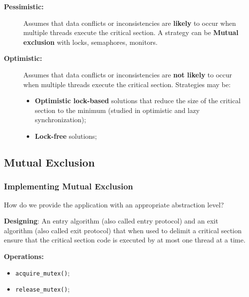 \begin{description}
    \item[\textbf{Pessimistic:}]
    Assumes that data conflicts or inconsistencies are \textbf{likely} to occur when multiple threads execute the critical section. A strategy can be \textbf{Mutual exclusion} with locks, semaphores, monitors.
    \item[\textbf{Optimistic:}]
    Assumes that data conflicts or inconsistencies are \textbf{not likely} to occur when multiple threads execute the critical section. Strategies may be:
    \begin{itemize}
        \item \textbf{Optimistic lock-based} solutions that reduce the size of the critical section to the minimum (studied in optimistic and lazy synchronization);
        \item \textbf{Lock-free} solutions;
    \end{itemize}
\end{description}
\subsection{Mutual Exclusion}
\subsubsection{Implementing Mutual Exclusion}
\par How do we provide the application with an appropriate abstraction level?
\par \textbf{Designing}: An entry algorithm (also called entry protocol) and an exit algorithm (also called exit protocol) that when used to delimit a critical section ensure that the critical section code is executed by at most one thread at a time.
\par \textbf{Operations:}
\begin{itemize}
    \item \texttt{acquire\_mutex()};
    \item \texttt{release\_mutex()};
\end{itemize}
%
\clearpage
%
